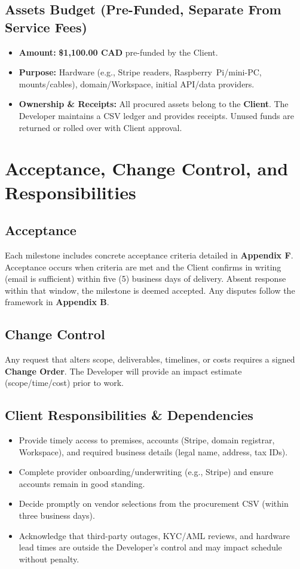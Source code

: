 \documentclass[11pt, a4paper]{article}
\begin{document}
\subsection{Assets Budget (Pre-Funded, Separate From Service Fees)}
\label{sec:assets}
\begin{itemize}
  \item \textbf{Amount:} \textbf{\$1{,}100.00 CAD} pre-funded by the Client.
  \item \textbf{Purpose:} Hardware (e.g., Stripe readers, Raspberry~Pi/mini-PC, mounts/cables), domain/Workspace, initial API/data providers.
  \item \textbf{Ownership \& Receipts:} All procured assets belong to the \textbf{Client}. The Developer maintains a CSV ledger and provides receipts. Unused funds are returned or rolled over with Client approval.
\end{itemize}

\section{Acceptance, Change Control, and Responsibilities}
\subsection*{Acceptance}
Each milestone includes concrete acceptance criteria detailed in \textbf{Appendix F}. Acceptance occurs when criteria are met and the Client confirms in writing (email is sufficient) within five (5) business days of delivery. Absent response within that window, the milestone is deemed accepted. Any disputes follow the framework in \textbf{Appendix B}.

\subsection*{Change Control}
Any request that alters scope, deliverables, timelines, or costs requires a signed \textbf{Change Order}. The Developer will provide an impact estimate (scope/time/cost) prior to work.

\subsection*{Client Responsibilities \& Dependencies}
\begin{itemize}[leftmargin=*]
  \item Provide timely access to premises, accounts (Stripe, domain registrar, Workspace), and required business details (legal name, address, tax IDs).
  \item Complete provider onboarding/underwriting (e.g., Stripe) and ensure accounts remain in good standing.
  \item Decide promptly on vendor selections from the procurement CSV (within three business days).
  \item Acknowledge that third-party outages, KYC/AML reviews, and hardware lead times are outside the Developer’s control and may impact schedule without penalty.
\end{itemize}
\end{document}
